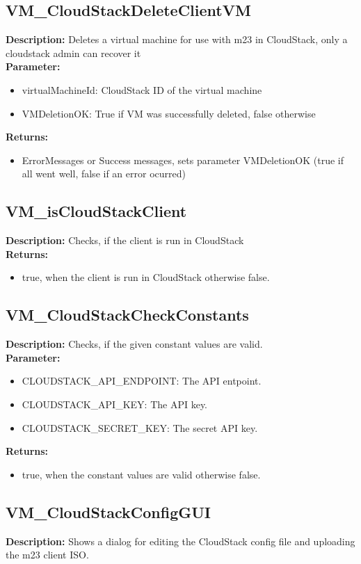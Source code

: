 \subsection{VM\_CloudStackDeleteClientVM}
\textbf{Description:} Deletes a virtual machine for use with m23 in CloudStack, only a cloudstack admin can recover it\\
\textbf{Parameter:}
\begin{itemize}
\item virtualMachineId:  CloudStack ID of the virtual machine
\item VMDeletionOK: True if VM was successfully deleted, false otherwise
\end{itemize}
\textbf{Returns:}
\begin{itemize}
\item ErrorMessages or Success messages, sets parameter VMDeletionOK (true if all went well, false if an error ocurred)
\end{itemize}

\subsection{VM\_isCloudStackClient}
\textbf{Description:} Checks, if the client is run in CloudStack\\
\textbf{Returns:}
\begin{itemize}
\item true, when the client is run in CloudStack otherwise false.
\end{itemize}

\subsection{VM\_CloudStackCheckConstants}
\textbf{Description:} Checks, if the given constant values are valid.\\
\textbf{Parameter:}
\begin{itemize}
\item CLOUDSTACK\_API\_ENDPOINT: The API entpoint.
\item CLOUDSTACK\_API\_KEY: The API key.
\item CLOUDSTACK\_SECRET\_KEY: The secret API key.
\end{itemize}
\textbf{Returns:}
\begin{itemize}
\item true, when the constant values are valid otherwise false.
\end{itemize}

\subsection{VM\_CloudStackConfigGUI}
\textbf{Description:} Shows a dialog for editing the CloudStack config file and uploading the m23 client ISO.\\

